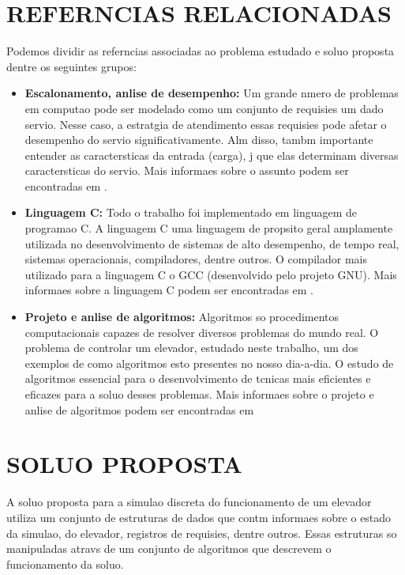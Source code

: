 \documentclass[12pt]{article}
\begin{document}
\section{REFERNCIAS RELACIONADAS}
\label{trabalhos_relacionados}

Podemos dividir as referncias associadas ao problema estudado e  soluo proposta dentre os seguintes grupos:
\begin{itemize}
\item \textbf{Escalonamento, anlise de desempenho:} Um grande nmero de problemas em computao pode ser modelado como um conjunto de requisies  um dado servio. Nesse caso, a estratgia de atendimento  essas requisies pode afetar o desempenho do servio significativamente. Alm disso, tambm  importante entender as caractersticas da entrada (carga), j que elas determinam diversas caractersticas do servio. Mais informaes sobre o assunto podem ser encontradas em \cite{jain1991acs}.
\item \textbf{Linguagem C:}
	Todo o trabalho foi implementado em linguagem de programao C. A linguagem C  uma linguagem de propsito geral amplamente utilizada no desenvolvimento de sistemas de alto desempenho, de tempo real, sistemas operacionais, compiladores, dentre outros. O compilador mais utilizado para a linguagem C  o GCC (desenvolvido pelo projeto GNU). Mais informaes sobre a linguagem C podem ser encontradas em \cite{kernighan1988cpl}.
\item \textbf{Projeto e anlise de algoritmos:} Algoritmos so procedimentos computacionais capazes de resolver diversos problemas do mundo real. O problema de controlar um elevador, estudado neste trabalho,  um dos exemplos de como algoritmos esto presentes no nosso dia-a-dia. O estudo de algoritmos  essencial para o desenvolvimento de tcnicas mais eficientes e eficazes para a soluo desses problemas. Mais informaes sobre o projeto e anlise de algoritmos podem ser encontradas em \cite{ziviani2007pai,cormen2001ia,sedgewick2001acp}
\end{itemize}

\section{SOLUO PROPOSTA}
\label{solucao_proposta}

A soluo proposta para a simulao discreta do funcionamento de um elevador utiliza um conjunto de estruturas de dados que contm informaes sobre o estado da simulao, do elevador, registros de requisies, dentre outros. Essas estruturas so manipuladas atravs de um conjunto de algoritmos que descrevem o funcionamento da soluo.
\end{document}
